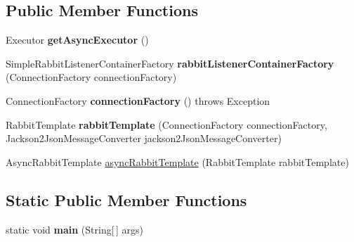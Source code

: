 \subsection*{Public Member Functions}
\begin{DoxyCompactItemize}
\item 
\mbox{\label{classeu_1_1h2020_1_1symbiote_1_1InterworkingInterfaceApplication_af4632289d17d2ab6eab0d66dc49a4fe5}} 
Executor {\bfseries get\+Async\+Executor} ()
\item 
\mbox{\label{classeu_1_1h2020_1_1symbiote_1_1InterworkingInterfaceApplication_a17abcc8766dfac302cda76de4fc239fc}} 
Simple\+Rabbit\+Listener\+Container\+Factory {\bfseries rabbit\+Listener\+Container\+Factory} (Connection\+Factory connection\+Factory)
\item 
\mbox{\label{classeu_1_1h2020_1_1symbiote_1_1InterworkingInterfaceApplication_a6846e372032cd37bb5b3a187c8c8c70c}} 
Connection\+Factory {\bfseries connection\+Factory} ()  throws Exception 
\item 
\mbox{\label{classeu_1_1h2020_1_1symbiote_1_1InterworkingInterfaceApplication_ad8d56234a0dc97acb64e41eaf4b22691}} 
Rabbit\+Template {\bfseries rabbit\+Template} (Connection\+Factory connection\+Factory, Jackson2\+Json\+Message\+Converter jackson2\+Json\+Message\+Converter)
\item 
Async\+Rabbit\+Template \hyperlink{classeu_1_1h2020_1_1symbiote_1_1InterworkingInterfaceApplication_a45f372aa4f5e90820f58913d5c2377c5}{async\+Rabbit\+Template} (Rabbit\+Template rabbit\+Template)
\end{DoxyCompactItemize}
\subsection*{Static Public Member Functions}
\begin{DoxyCompactItemize}
\item 
\mbox{\label{classeu_1_1h2020_1_1symbiote_1_1InterworkingInterfaceApplication_a2a665798ab250c514ac683becc6216e1}} 
static void {\bfseries main} (String\mbox{[}$\,$\mbox{]} args)
\end{DoxyCompactItemize}


